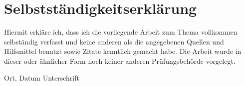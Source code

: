 \pagestyle{empty}

\clearpage %



\section{Selbstständigkeitserklärung}
Hiermit erkläre ich, dass ich die vorliegende Arbeit zum Thema \textit{\meinTitel}
vollkommen selbständig verfasst und keine anderen als die angegebenen
Quellen und Hilfsmittel benutzt sowie Zitate kenntlich gemacht habe.
Die Arbeit wurde in dieser oder ähnlicher Form noch keiner anderen
Prüfungsbehörde vorgelegt.

\vspace{4cm}

\hspace{2cm} Ort, Datum \hfill Unterschrift \hspace{2cm}


\setcounter{page}{1}
\newpage
\pagestyle{fancy}